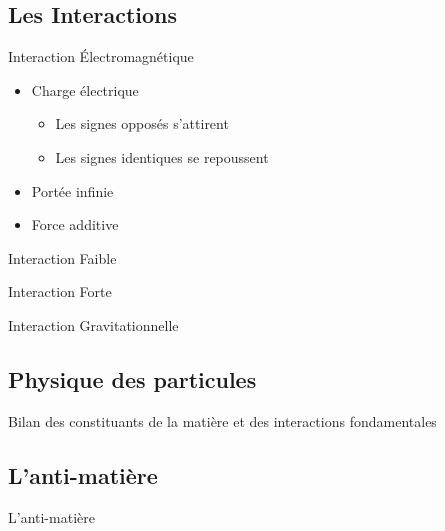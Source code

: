 \documentclass[handout,8pt]{beamer} %
\begin{document}
\subsection{Les Interactions}

\begin{frame}{Interaction Électromagnétique}

	\begin{block}{}
		\begin{itemize}
			\item Charge électrique
			\begin{itemize}
				\item Les signes opposés s'attirent 
				\item Les signes identiques se repoussent
			\end{itemize}
			\item Portée infinie 
			\item Force additive
		\end{itemize}
	\end{block}
\end{frame}

\begin{frame}{Interaction Faible}
	
\end{frame}

\begin{frame}{Interaction Forte}
	
\end{frame}

\begin{frame}{Interaction Gravitationnelle}
	
\end{frame}

\subsection{Physique des particules}
\begin{frame}{Bilan des constituants de la matière et des interactions fondamentales}

\end{frame}

\subsection{L’anti-matière}
\begin{frame}{L'anti-matière}

\end{frame}
\end{document}
